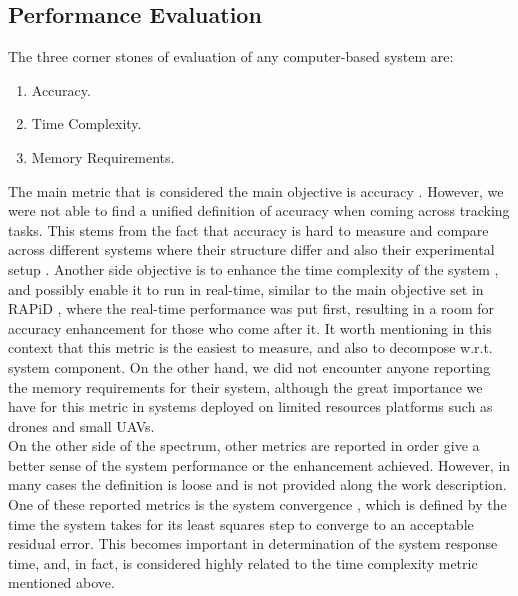 \documentclass{article}
\begin{document}
\subsection{Performance Evaluation}
The three corner stones of evaluation of any computer-based system are:
\begin{enumerate}
\item Accuracy.
\item Time Complexity.
\item Memory Requirements.
\end{enumerate}
The main metric that is considered the main objective is accuracy \cite{SSDTracking} \cite{4270499} \cite{4775902}. However, we were not able to find a unified definition of accuracy when coming across tracking tasks. This stems from the fact that accuracy is hard to measure and compare across different systems where their structure differ and also their experimental setup \cite{lepetit2005monocular}. Another side objective is to enhance the time complexity of the system \cite{lepetit2005monocular} \cite{haag1999combination}, and possibly enable it to run in real-time, similar to the main objective set in RAPiD \cite{harris1990rapid}, where the real-time performance was put first, resulting in a room for accuracy enhancement for those who come after it. It worth mentioning in this context that this metric is the easiest to measure, and also to decompose w.r.t. system component.  On the other hand, we did not encounter anyone reporting the memory requirements for their system, although the great importance we have for this metric in systems deployed on limited resources platforms such as drones and small UAVs. \\
On the other side of the spectrum, other metrics are reported in order give a better sense of the system performance or the enhancement achieved. However, in many cases the definition is loose and is not provided along the work description. One of these reported metrics is the system convergence \cite{SSDTracking}, which is defined by the time the system takes for its least squares step to converge to an acceptable residual error. This becomes important in determination of the system response time, and, in fact, is considered highly related to the time complexity metric mentioned above.
\end{document}
